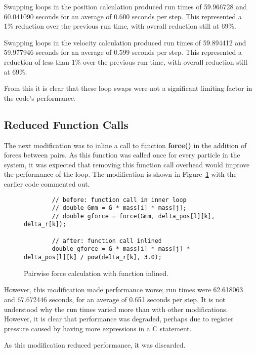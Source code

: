 \documentclass[11pt, oneside]{article}   %
\begin{document}
Swapping loops in the position calculation produced run times of 59.966728 and 60.041090 seconds for an average of 0.600 seconds per step.
This represented a 1\% reduction over the previous run time, with overall reduction still at 69\%.

Swapping loops in the velocity calculation produced run times of 59.894412 and 59.977946 seconds for an average of 0.599 seconds per step.
This represented a reduction of less than 1\% over the previous run time, with overall reduction still at 69\%.

From this it is clear that these loop swaps were not a significant limiting factor in the code's performance.

\subsection{Reduced Function Calls}
The next modification was to inline a call to function \textbf{force()} in the addition of forces between pairs.
As this function was called once for every particle in the system, it was expected that removing this function call overhead would improve the performance of the loop.
The modification is shown in Figure~\ref{figure:CallMod} with the earlier code commented out.

\begin{figure}
	\begin{lstlisting}
		// before: function call in inner loop
		// double Gmm = G * mass[i] * mass[j];
		// double gforce = force(Gmm, delta_pos[l][k], delta_r[k]);

		// after: function call inlined
		double gforce = G * mass[i] * mass[j] * delta_pos[l][k] / pow(delta_r[k], 3.0);
	\end{lstlisting}
	\caption{Pairwise force calculation with function inlined.}
	\label{figure:CallMod}
\end{figure}

However, this modification made performance worse; run times were 62.618063 and 67.672446 seconds, for an average of 0.651 seconds per step.
It is not understood why the run times varied more than with other modifications.
However, it is clear that performance was degraded, perhaps due to register pressure caused by having more expressions in a C statement.

As this modification reduced performance, it was discarded.
\end{document}
